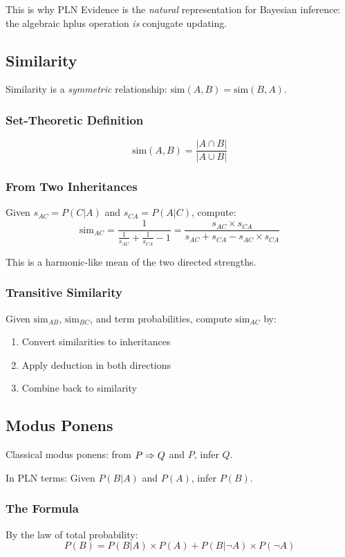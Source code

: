 \documentclass[]{article}
\begin{document}
This is why PLN Evidence is the \emph{natural} representation for
Bayesian inference: the algebraic hplus operation \emph{is} conjugate
updating.

\subsection{Similarity}
\label{sec:similarity}
Similarity is a \emph{symmetric} relationship: $\text{sim}(A, B) =
\text{sim}(B, A)$.

\subsubsection{Set-Theoretic Definition}
$$\text{sim}(A, B) = \frac{|A \cap B|}{|A \cup B|}$$

\subsubsection{From Two Inheritances}
Given $s_{AC} = P(C|A)$ and $s_{CA} = P(A|C)$, compute:
$$\text{sim}_{AC} = \frac{1}{\frac{1}{s_{AC}} + \frac{1}{s_{CA}} - 1}
  = \frac{s_{AC} \times s_{CA}}{s_{AC} + s_{CA} - s_{AC} \times s_{CA}}$$

This is a harmonic-like mean of the two directed strengths.

\subsubsection{Transitive Similarity}
Given $\text{sim}_{AB}$, $\text{sim}_{BC}$, and term probabilities,
compute $\text{sim}_{AC}$ by:
\begin{enumerate}
\item Convert similarities to inheritances
\item Apply deduction in both directions
\item Combine back to similarity
\end{enumerate}

\subsection{Modus Ponens}
\label{sec:modusponens}
Classical modus ponens: from $P \Rightarrow Q$ and $P$, infer $Q$.

In PLN terms: Given $P(B|A)$ and $P(A)$, infer $P(B)$.

\subsubsection{The Formula}
By the law of total probability:
$$P(B) = P(B|A) \times P(A) + P(B|\neg A) \times P(\neg A)$$
\end{document}
